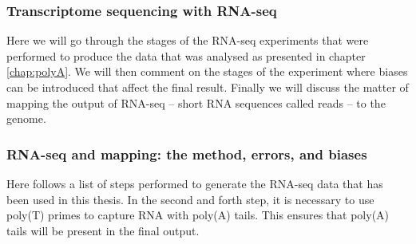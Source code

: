 %
\subsubsection{Transcriptome sequencing with RNA-seq}
Here we will go through the stages of the RNA-seq experiments that were
performed to produce the data that was analysed as presented in chapter
\ref{chap:polyA}. We will then comment on the stages of the experiment where
biases can be introduced that affect the final result. Finally we will discuss
the matter of mapping the output of RNA-seq -- short RNA sequences called reads
-- to the genome.

\subsubsection{RNA-seq and mapping: the method, errors, and biases}

Here follows a list of steps performed to generate the RNA-seq data that has
been used in this thesis. In the second and forth step, it is necessary to use
poly(T) primes to capture RNA with poly(A) tails. This ensures that poly(A)
tails will be present in the final output.

